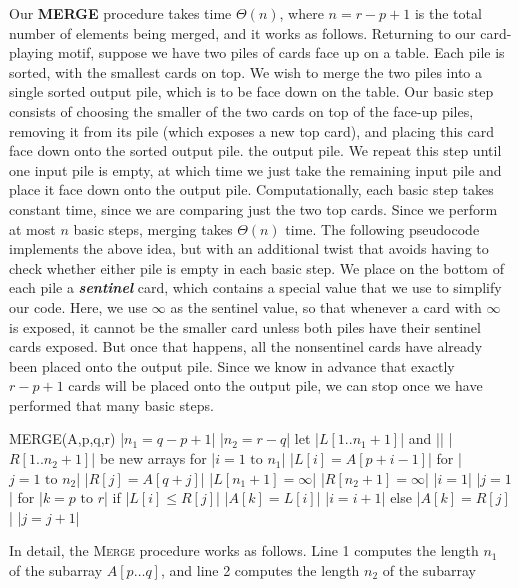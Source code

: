 \documentclass{report}
\begin{document}
    \bigbreak \noindent 
    Our \textbf{MERGE} procedure takes time \( \Theta(n) \), where \( n = r - p + 1 \) is the total number of elements being merged, and it works as follows. Returning to our card-playing motif, suppose we have two piles of cards face up on a table. Each pile is sorted, with the smallest cards on top. We wish to merge the two piles into a single sorted output pile, which is to be face down on the table. Our basic step consists of choosing the smaller of the two cards on top of the face-up piles, removing it from its pile (which exposes a new top card), and placing this card face down onto the sorted output pile. the output pile. We repeat this step until one input pile is empty, at which time we just take the remaining input pile and place it face down onto the output pile. Computationally, each basic step takes constant time, since we are comparing just the two top cards. Since we perform at most $n$ basic steps, merging takes $\Theta(n)$ time.
    \bigbreak \noindent 
    The following pseudocode implements the above idea, but with an additional twist that avoids having to check whether either pile is empty in each basic step. We place on the bottom of each pile a \textbf{\textit{sentinel}} card, which contains a special value that we use to simplify our code. Here, we use $\infty $ as the sentinel value, so that whenever a card with $\infty $ is exposed, it cannot be the smaller card unless both piles have their sentinel cards exposed. But once that happens, all the nonsentinel cards have already been placed onto the output pile. Since we know in advance that exactly $r - p + 1$ cards will be placed onto the output pile, we can stop once we have performed that many basic steps.
    \bigbreak \noindent 
    \begin{cppcode}
    MERGE(A,p,q,r)
        |$n_{1} = q-p+1$|
        |$n_{2} = r-q$|
        let |$L[1..n_{1} + 1]$| and |$ $| |$R[1..n_{2} + 1]$| be new arrays
        for |$i=1 \text{ to } n_{1}$|
            |$L[i] = A[p+i-1]$|
        for |$j=1 \text{ to } n_{2}$|
            |$R[j] = A[q+j]$|
        |$L[n_{1} + 1] = \infty$|
        |$R[n_{2} + 1] = \infty$|
        |$i = 1$|
        |$j = 1$|
        for |$k=p \text{ to } r$|
            if |$L[i] \leq R[j]$|
                |$A[k] = L[i]$|
                |$i = i + 1$|
            else
            |$A[k] = R[j]$|
            |$j = j+1$|
        \end{cppcode}
        \bigbreak \noindent 
        In detail, the \textsc{Merge} procedure works as follows. Line 1 computes the length $n_1$ 
        of the subarray $A[p \dots q]$, and line 2 computes the length $n_2$ of the subarray 
\end{document}
